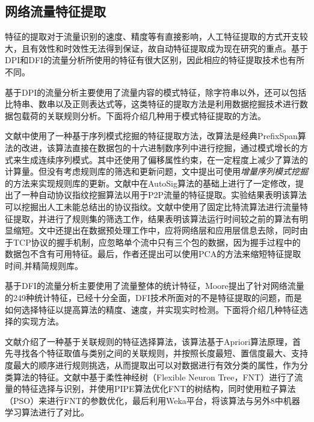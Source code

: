 \documentclass[a4papper]{article}
\begin{document}
\subsection{网络流量特征提取}
\par\setlength{\parindent}{2em} %
特征的提取对于流量识别的速度、精度等有直接影响，人工特征提取的方式开支较大，且有效性和时效性无法得到保证，故自动特征提取成为现在研究的重点。基于DPI和DFI的流量分析所使用的特征有很大区别，因此相应的特征提取技术也有所不同。
\par\setlength{\parindent}{2em} %
基于DPI的流量分析主要使用了流量内容的模式特征，除字符串以外，还可以包括比特串、数串以及正则表达式等，这类特征的提取方法是利用数据挖掘技术进行数据包载荷的关联规则分析。下面将介绍几种用于模式特征提取的方法。
\par\setlength{\parindent}{2em} %
文献\cite{林冠洲2011网络流量识别关键技术研究}中使用了一种基于序列模式挖掘的特征提取方法，改算法是经典PrefixSpan算法的改进，该算法直接在数据包的十六进制数序列中进行挖掘，通过模式增长的方式来生成连续序列模式。其中还使用了偏移属性约束，在一定程度上减少了算法的计算量。但没有考虑规则库的筛选和更新问题，文中提出可使用\emph{增量序列模式挖掘}的方法来实现规则库的更新。文献\cite{马婧2012网络流量特征提取与流量识别研究}中在AutoSig算法的基础上进行了一定修改，提出了一种自动协议指纹挖掘算法以用于P2P流量的特征提取。实验结果表明该算法可以挖掘出人工未能总结出的协议指纹。文献\cite{牟澄2014互联网流量特征智能提取关键技术研究}中使用了固定比特流算法进行流量特征提取，并进行了规则集的筛选工作，结果表明该算法运行时间较之前的算法有明显缩短。文中还提出在数据预处理工作中，应将网络层和应用层信息去除，同时由于TCP协议的握手机制，应忽略单个流中只有三个包的数据，因为握手过程中的数据包不含有可用特征。最后，作者还提出可以使用PCA的方法来缩短特征提取时间,并精简规则库。

\par\setlength{\parindent}{2em} %
基于DFI的流量分析主要使用了流量整体的统计特征，Moore提出了针对网络流量的249种统计特征，已经十分全面，DFI技术所面对的不是特征提取的问题，而是如何选择特征以提高算法的精度、速度，并实现实时检测。下面将介绍几种特征选择的实现方法。
\par\setlength{\parindent}{2em} %
文献\cite{武建华2009基于关联规则的特征选择算法}介绍了一种基于关联规则的特征选择算法，该算法基于Apriori算法原理，首先寻找各个特征取值与类别之间的关联规则，并按照长度最短、置信度最大、支持度最大的顺序进行规则挑选，从而提取出可以对数据进行有效分类的属性，作为分类算法的特征。文献\cite{彭立志2015基于机器学习的流量识别关键技术研究}中基于柔性神经树（Flexible Neuron Tree，FNT）进行了流量的特征选择与识别，并使用PIPE算法优化FNT的树结构，同时使用粒子算法（PSO）来进行FNT的参数优化，最后利用Weka平台，将该算法与另外8中机器学习算法进行了对比。
\end{document}
